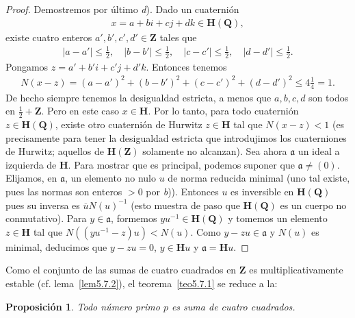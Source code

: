 \documentclass[oneside,bibtotoc,leqno,spanish]{amsbook}
\newcommand{\QQ}{\mathbf{Q}}
\newcommand{\ZZ}{\mathbf{Z}}
\newcommand{\HH}{\mathbf{H}}
\newcommand{\idl}[1]{\mathfrak{#1}}
\newcommand{\QED}{}%
\newcommand{\oline}[1]{\overline{#1}}
\newcommand{\abs}[1]{\left\lvert#1\right\rvert}
\numberwithin{equation}{section}
\theoremstyle{defi}
\theoremstyle{note}
\newtheorem{proposition}{Proposici\'on}
\theoremstyle{rem}
\numberwithin{theorem}{section}
\numberwithin{proposition}{section}
\numberwithin{definition}{section}
\numberwithin{lemma}{section}
\numberwithin{corollary}{section}
\numberwithin{example}{section}
\numberwithin{footnote}{section}%
\begin{document}
\begin{proof}
Demostremos por \'ultimo {\itshape d}). Dado un cuaterni\'on
\begin{gather*}
x=a+bi+cj+dk\in\HH(\QQ),
\end{gather*}
existe cuatro enteros $a',b',c',d'\in\ZZ$ tales que
\begin{gather*}
\abs{a-a'}\leq\frac{1}{2},\quad\abs{b-b'}\leq\frac{1}{2},\quad\abs{c-c'}\leq\frac{1}{2},\quad
\abs{d-d'}\leq\frac{1}{2}.
\end{gather*}
Pongamos $z = a'+b'i+c'j+d'k$. Entonces tenemos
\begin{gather*}
N(x-z) = (a-a')^{2}+(b-b')^{2}+(c-c')^{2}+(d-d')^{2}\leq 4\frac{1}{4}=1.
\end{gather*}
De hecho siempre tenemos la desigualdad estricta, a menos que $a,b,c,d$ son todos en $\frac{1}{2}+\ZZ$.
Pero en este caso $x\in\HH$. Por lo tanto, para todo cuaterni\'on $z\in\HH(\QQ)$, existe otro cuaterni\'on de
Hurwitz $z\in\HH$ tal que $N(x-z) < 1$ (es precisamente para tener la desigualdad estricta que introdujimos
los cuaterniones de Hurwitz; aquellos de $\HH(\ZZ)$ solamente no alcanzan). Sea ahora $\idl{a}$ un
ideal a izquierda de $\HH$. Para mostrar que es principal, podemos suponer que $\idl{a}\neq(0)$. Elijamos,
en $\idl{a}$, un elemento no nulo $u$ de norma reducida minimal (uno tal existe, pues las normas son
enteros $>0$ por {\itshape b})). Entonces $u$ es inversible en $\HH(\QQ)$ pues su inversa es
$\oline uN(u)^{-1}$ (esto muestra de paso que $\HH(\QQ)$ es un cuerpo no conmutativo). Para $y\in\idl{a}$,
formemos $yu^{-1}\in\HH(\QQ)$ y tomemos un elemento $z\in\HH$ tal que $N((yu^{-1}-z)u)<N(u)$.
Como $y-zu\in\idl{a}$ y $N(u)$ es minimal, deducimos que $y-zu=0$, $y\in\HH u$ y $\idl{a} = \HH u$. \QED
\end{proof}

Como el conjunto de las sumas de cuatro cuadrados en $\ZZ$ es multiplicativamente estable
(cf. lema~\ref{lem5.7.2}), el teorema~\ref{teo5.7.1} se reduce a la:

\begin{proposition}
Todo n\'umero primo $p$ es suma de cuatro cuadrados.
\end{proposition}
\end{document}
